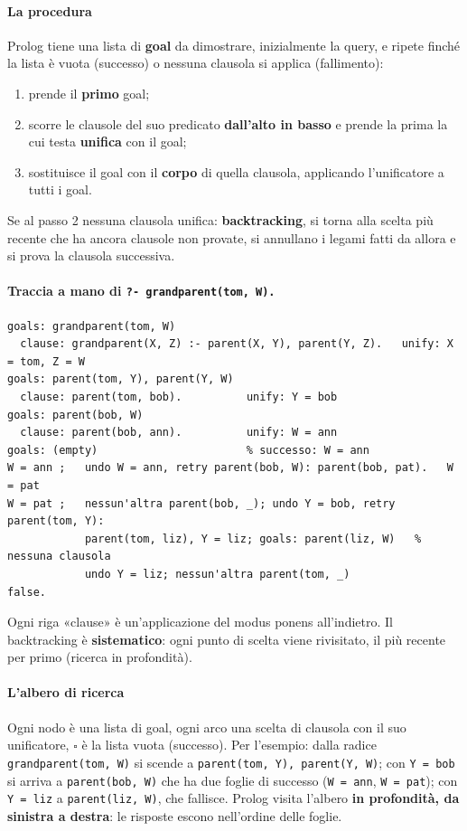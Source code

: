 \documentclass[a4paper,12pt]{article}
\begin{document}
\paragraph{La procedura} Prolog tiene una lista di \textbf{goal} da dimostrare, inizialmente la
query, e ripete finché la lista è vuota (successo) o nessuna clausola si applica (fallimento):
\begin{enumerate}[nosep]
  \item prende il \textbf{primo} goal;
  \item scorre le clausole del suo predicato \textbf{dall'alto in basso} e prende la prima la cui
        testa \textbf{unifica} con il goal;
  \item sostituisce il goal con il \textbf{corpo} di quella clausola, applicando l'unificatore a
        tutti i goal.
\end{enumerate}
Se al passo 2 nessuna clausola unifica: \textbf{backtracking}, si torna alla scelta più recente
che ha ancora clausole non provate, si annullano i legami fatti da allora e si prova la
clausola successiva.

\paragraph{Traccia a mano di \texttt{?- grandparent(tom, W).}}
\begin{verbatim}
goals: grandparent(tom, W)
  clause: grandparent(X, Z) :- parent(X, Y), parent(Y, Z).   unify: X = tom, Z = W
goals: parent(tom, Y), parent(Y, W)
  clause: parent(tom, bob).          unify: Y = bob
goals: parent(bob, W)
  clause: parent(bob, ann).          unify: W = ann
goals: (empty)                       % successo: W = ann
W = ann ;   undo W = ann, retry parent(bob, W): parent(bob, pat).   W = pat
W = pat ;   nessun'altra parent(bob, _); undo Y = bob, retry parent(tom, Y):
            parent(tom, liz), Y = liz; goals: parent(liz, W)   % nessuna clausola
            undo Y = liz; nessun'altra parent(tom, _)
false.
\end{verbatim}
Ogni riga «clause» è un'applicazione del modus ponens all'indietro. Il backtracking è
\textbf{sistematico}: ogni punto di scelta viene rivisitato, il più recente per primo (ricerca in
profondità).

\paragraph{L'albero di ricerca} Ogni nodo è una lista di goal, ogni arco una scelta di clausola
con il suo unificatore, $\square$ è la lista vuota (successo). Per l'esempio: dalla radice
\texttt{grandparent(tom, W)} si scende a \texttt{parent(tom, Y), parent(Y, W)}; con
\texttt{Y = bob} si arriva a \texttt{parent(bob, W)} che ha due foglie di successo
(\texttt{W = ann}, \texttt{W = pat}); con \texttt{Y = liz} a \texttt{parent(liz, W)}, che fallisce.
Prolog visita l'albero \textbf{in profondità, da sinistra a destra}: le risposte escono
nell'ordine delle foglie.
\end{document}
